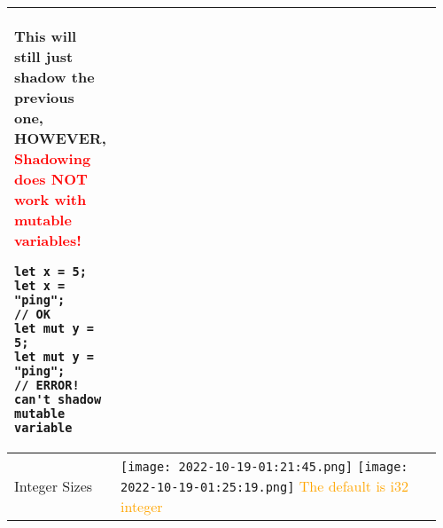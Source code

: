 \documentclass[main.tex,fontsize=8pt,paper=a4,paper=portrait,DIV=calc,]{scrartcl}
\begin{document}
\begin{table}[ht!]
\begin{tabular}{|m{0.2\linewidth}|m{0.755\linewidth}|}
{This will still just shadow the previous one, \textbf{HOWEVER}, }\textcolor{red}{Shadowing does \textbf{NOT work with mutable variables!}}\newline
\begin{lstlisting}
let x = 5;
let x = "ping";
// OK
let mut y = 5;
let mut y = "ping";
// ERROR! can't shadow mutable variable
\end{lstlisting}\\
\hline 
Integer Sizes& 
\vspace{2mm}
\texttt{[image: 2022-10-19-01:21:45.png]}
\texttt{[image: 2022-10-19-01:25:19.png]}\newline
\textcolor{orange}{The default is i32 integer}
\\
\hline
\end{tabular}
\end{table}
\pagebreak
\end{document}
